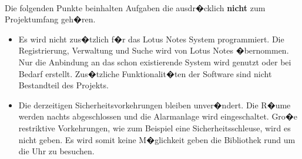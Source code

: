 \paragraph*{}
Die folgenden Punkte beinhalten Aufgaben die ausdr�cklich \textbf{nicht} zum Projektumfang geh�ren.
\begin{itemize}
\item Es wird nicht zus�tzlich f�r das Lotus Notes System programmiert. Die Registrierung, Verwaltung und Suche wird von Lotus Notes �bernommen. Nur die Anbindung an das schon existierende System wird genutzt oder bei Bedarf erstellt.  Zus�tzliche Funktionalit�ten der Software sind nicht Bestandteil des Projekts.
\item Die derzeitigen Sicherheitsvorkehrungen bleiben unver�ndert. Die R�ume werden nachts abgeschlossen und die Alarmanlage wird eingeschaltet. Gro�e restriktive Vorkehrungen, wie zum Beispiel eine Sicherheitsschleuse, wird es nicht geben. Es wird somit keine M�glichkeit geben die Bibliothek rund um die Uhr zu besuchen.
\end{itemize}